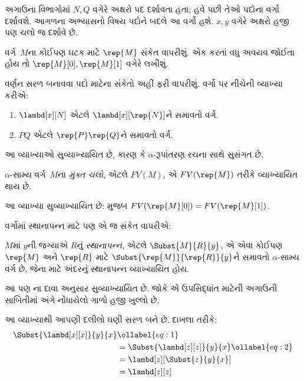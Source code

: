 અગાઉના વિભાગોમાં $N, Q$ વગેરે અક્ષરો પદ દર્શાવતા હતા;
હવે પછી તેઓ પદોના વર્ગો દર્શાવશે. આગળના અભ્યાસનો વિષય
પદોને બદલે આ વર્ગો હશે. $x, y$ વગેરે અક્ષરો હજી પણ
ચલો જ દર્શાવે છે.

વર્ગ~$M$ના કોઈપણ ઘટક માટે $\rep{M}$ સંકેત વાપરીશું.
એક કરતાં વધુ અવયવ જોઈતા હોય તો $\rep{M}[0], \rep{M}[1]$
વગેરે લખીશું.

વર્ણન સરળ બનાવવા પદો માટેના સંકેતો અહીં ફરી વાપરીશું.
વર્ગો પર નીચેની વ્યાખ્યા કરીએ:
\begin{defn}
  \begin{enumerate}
  \item $\lambd[x][N]$ એટલે $\lambd[x][\rep{N}]$ને
    સમાવતો વર્ગ.
  \item $PQ$ એટલે $\rep{P}\rep{Q}$ને સમાવતો વર્ગ.
  \end{enumerate}
\end{defn}

આ વ્યાખ્યાઓ સુવ્યાખ્યાયિત છે, કારણ કે $\alpha$-રૂપાંતરણ
રચના સાથે સુસંગત છે.

\begin{defn} 
  $\alpha$-સામ્ય વર્ગ~$M$ના \emph{મુક્ત ચલો}, એટલે
  $FV(M)$, એ $FV(\rep{M})$ તરીકે વ્યાખ્યાયિત થાય છે.
\end{defn}

આ વ્યાખ્યા સુવ્યાખ્યાયિત છે:  મુજબ
$FV(\rep{M}[0]) = FV(\rep{M}[1])$.

વર્ગોમાં સ્થાનાપન્ન માટે પણ એ જ સંકેત વાપરીએ:
\begin{defn} 
  $M$માં $y$ની જગ્યાએ $R$નું \emph{સ્થાનાપન્ન}, એટલે
  $\Subst{M}{R}{y}$, એ એવા કોઈપણ $\rep{M}$ અને
  $\rep{R}$ માટે $\Subst{\rep{M}}{\rep{R}}{y}$ને
  સમાવતો $\alpha$-સામ્ય વર્ગ છે, જેના માટે અંદરનું
  સ્થાનાપન્ન વ્યાખ્યાયિત હોય.
\end{defn}

આ પણ ના દાવા અનુસાર સુવ્યાખ્યાયિત
છે. જોકે એ ઉપસિદ્ધાંત માટેની અગાઉની સાબિતીમાં
 અંગે નોંધાયેલો ગાળો હજી ખુલ્લો છે.

આ વ્યાખ્યાથી આપણી દલીલો ઘણી સરળ બને છે. દાખલા તરીકે:
\begin{align}
  \Subst{\lambd[x][x]}{y}{x} & \ollabel{eq:1}\\
  &= \Subst{\lambd[z][z]}{y}{x} \ollabel{eq:2}\\
  &= \lambd[z][\Subst{z}{y}{x}] \\
  &= \lambd[z][z]
\end{align}

